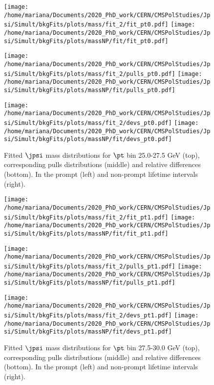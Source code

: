 \begin{figure}[h!]
\centering
\texttt{[image: /home/mariana/Documents/2020\_PhD\_work/CERN/CMSPolStudies/Jpsi/Simult/bkgFits/plots/mass/fit\_2/fit\_pt0.pdf]}
\texttt{[image: /home/mariana/Documents/2020\_PhD\_work/CERN/CMSPolStudies/Jpsi/Simult/bkgFits/plots/massNP/fit/fit\_pt0.pdf]}

\texttt{[image: /home/mariana/Documents/2020\_PhD\_work/CERN/CMSPolStudies/Jpsi/Simult/bkgFits/plots/mass/fit\_2/pulls\_pt0.pdf]}
\texttt{[image: /home/mariana/Documents/2020\_PhD\_work/CERN/CMSPolStudies/Jpsi/Simult/bkgFits/plots/massNP/fit/pulls\_pt0.pdf]}

\texttt{[image: /home/mariana/Documents/2020\_PhD\_work/CERN/CMSPolStudies/Jpsi/Simult/bkgFits/plots/mass/fit\_2/devs\_pt0.pdf]}
\texttt{[image: /home/mariana/Documents/2020\_PhD\_work/CERN/CMSPolStudies/Jpsi/Simult/bkgFits/plots/massNP/fit/devs\_pt0.pdf]}
\caption{Fitted $\jpsi$ mass distributions for $\pt$ bin 25.0-27.5 GeV (top), corresponding pulls distributions (middle) and relative differences (bottom). In the prompt (left) and non-prompt lifetime intervals (right).}\label{f:m_fit_0}
\end{figure}

\pagebreak

\begin{figure}[h!]
\centering
\texttt{[image: /home/mariana/Documents/2020\_PhD\_work/CERN/CMSPolStudies/Jpsi/Simult/bkgFits/plots/mass/fit\_2/fit\_pt1.pdf]}
\texttt{[image: /home/mariana/Documents/2020\_PhD\_work/CERN/CMSPolStudies/Jpsi/Simult/bkgFits/plots/massNP/fit/fit\_pt1.pdf]}

\texttt{[image: /home/mariana/Documents/2020\_PhD\_work/CERN/CMSPolStudies/Jpsi/Simult/bkgFits/plots/mass/fit\_2/pulls\_pt1.pdf]}
\texttt{[image: /home/mariana/Documents/2020\_PhD\_work/CERN/CMSPolStudies/Jpsi/Simult/bkgFits/plots/massNP/fit/pulls\_pt1.pdf]}

\texttt{[image: /home/mariana/Documents/2020\_PhD\_work/CERN/CMSPolStudies/Jpsi/Simult/bkgFits/plots/mass/fit\_2/devs\_pt1.pdf]}
\texttt{[image: /home/mariana/Documents/2020\_PhD\_work/CERN/CMSPolStudies/Jpsi/Simult/bkgFits/plots/massNP/fit/devs\_pt1.pdf]}
\caption{Fitted $\jpsi$ mass distributions for $\pt$ bin 27.5-30.0 GeV (top), corresponding pulls distributions (middle) and relative differences (bottom). In the prompt (left) and non-prompt lifetime intervals (right).}\label{f:m_fit_1}
\end{figure}

